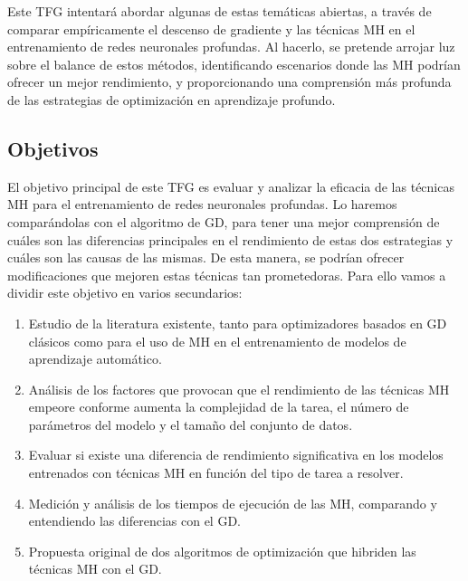 Este TFG intentará abordar algunas de estas temáticas abiertas, a través de comparar empíricamente el descenso de gradiente y las técnicas MH en el entrenamiento de redes neuronales profundas. Al hacerlo, se pretende arrojar luz sobre el balance de estos métodos, identificando escenarios donde las MH podrían ofrecer un mejor rendimiento, y proporcionando una comprensión más profunda de las estrategias de optimización en aprendizaje profundo. 





\subsection{Objetivos}\label{sec:objinf}

El objetivo principal de este TFG es evaluar y analizar la eficacia de las técnicas MH para el entrenamiento de redes neuronales profundas. Lo haremos comparándolas con el algoritmo de GD, para tener una mejor comprensión de cuáles son las diferencias principales en el rendimiento de estas dos estrategias y cuáles son las causas de las mismas. De esta manera, se podrían ofrecer modificaciones que mejoren estas técnicas tan prometedoras. Para ello vamos a dividir este objetivo en varios secundarios:

\begin{enumerate}

\item Estudio de la literatura existente, tanto para optimizadores basados en GD clásicos como para el uso de MH en el entrenamiento de modelos de aprendizaje automático.

\item Análisis de los factores que provocan que el rendimiento de las técnicas MH empeore conforme aumenta la complejidad de la tarea, el número de parámetros del modelo y el tamaño del conjunto de datos.

\item Evaluar si existe una diferencia de rendimiento significativa en los modelos entrenados con técnicas MH en función del tipo de tarea a resolver.

\item Medición y análisis de los tiempos de ejecución de las MH, comparando y entendiendo las diferencias con el GD.

\item Propuesta original de dos algoritmos de optimización que hibriden las técnicas MH con el GD.
\end{enumerate}






